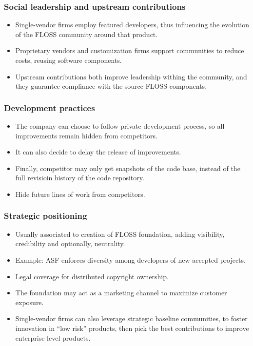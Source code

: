 
\begin{frame}
 \frametitle{Social leadership and upstream contributions}
\begin{itemize}
 \item Single-vendor firms employ featured developers, thus influencing the evolution of the FLOSS community
around that product.
 \item Proprietary vendors and customization firms support communities to reduce costs, reusing software components.
 \item Upstream contributions both improve leadership withing the community, and they guarantee compliance with the
source FLOSS components.
\end{itemize}

\end{frame}


\begin{frame}
 \frametitle{Development practices}
\begin{itemize}
 \item The company can choose to follow private development process, so all improvements remain hidden from competitors.
 \item It can also decide to delay the release of improvements.
 \item Finally, competitor may only get snapshots of the code base, instead of the full revisioin history of the code repository.
 \item Hide future lines of work from competitors.
\end{itemize}

\end{frame}


\begin{frame}
 \frametitle{Strategic positioning}
\begin{itemize}
 \item Usually associated to creation of FLOSS foundation, adding visibility, credibility and
optionally, neutrality.
 \item Example: ASF enforces diversity among developers of new accepted projects.
 \item Legal coverage for distributed copyright ownership.
 \item The foundation may act as a marketing channel to maximize customer exposure.
 \item Single-vendor firms can also leverage strategic baseline communities, to foster innovation in
``low risk'' products, then pick the best contributions to improve enterprise level products.
\end{itemize}

\end{frame}

